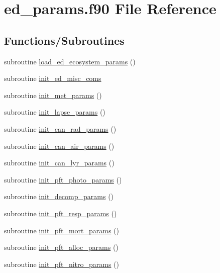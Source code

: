 \hypertarget{ed__params_8f90}{}\section{ed\+\_\+params.\+f90 File Reference}
\label{ed__params_8f90}
\subsection*{Functions/\+Subroutines}
\begin{DoxyCompactItemize}
\item 
subroutine \hyperlink{ed__params_8f90_af74bdb1b6959fc9b59288f80e8832f14}{load\+\_\+ed\+\_\+ecosystem\+\_\+params} ()
\item 
subroutine \hyperlink{ed__params_8f90_a51d5dbbd804bd90f13ddd0689c6e2b74}{init\+\_\+ed\+\_\+misc\+\_\+coms}
\item 
subroutine \hyperlink{ed__params_8f90_a82e540d1abc17b344e25567cce30f2fc}{init\+\_\+met\+\_\+params} ()
\item 
subroutine \hyperlink{ed__params_8f90_a9ad3fc95dae56221cb17769b1a51b852}{init\+\_\+lapse\+\_\+params} ()
\item 
subroutine \hyperlink{ed__params_8f90_ab8f34fc4864d52e9d15f2825fd5d42b2}{init\+\_\+can\+\_\+rad\+\_\+params} ()
\item 
subroutine \hyperlink{ed__params_8f90_a029548f8d070ed57f9c9b1e1a0a8fc3c}{init\+\_\+can\+\_\+air\+\_\+params} ()
\item 
subroutine \hyperlink{ed__params_8f90_a8006ef395d1da1e27d9cd7a2092b7505}{init\+\_\+can\+\_\+lyr\+\_\+params} ()
\item 
subroutine \hyperlink{ed__params_8f90_a675fee50cea1da3769cee4b99a67896d}{init\+\_\+pft\+\_\+photo\+\_\+params} ()
\item 
subroutine \hyperlink{ed__params_8f90_a2caf4cbc69ad3b7681fef571ba0d787b}{init\+\_\+decomp\+\_\+params} ()
\item 
subroutine \hyperlink{ed__params_8f90_a0263c036bee68fc0194b052a04e5316e}{init\+\_\+pft\+\_\+resp\+\_\+params} ()
\item 
subroutine \hyperlink{ed__params_8f90_a719e10b9e06dbf410f4a06eae937a544}{init\+\_\+pft\+\_\+mort\+\_\+params} ()
\item 
subroutine \hyperlink{ed__params_8f90_a3e351a017b9f9f9ef7843e9f7041be82}{init\+\_\+pft\+\_\+alloc\+\_\+params} ()
\item 
subroutine \hyperlink{ed__params_8f90_a1e97106c420d4474c8e99ca03cab1dca}{init\+\_\+pft\+\_\+nitro\+\_\+params} ()

\end{DoxyCompactItemize}
